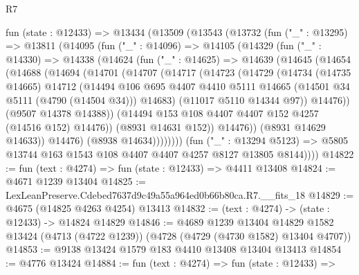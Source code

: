 \begin{lexlean}{R7}
\begin{coremodule}
  fun (state : @12433) =>
  @13434
    (@13509
      (@13543
        (@13732
          (fun ("_" : @13295) =>
          @13811
            (@14095
              (fun ("_" : @14096) =>
              @14105
                (@14329
                  (fun ("_" : @14330) =>
                  @14338
                    (@14624
                      (fun ("_" : @14625) =>
                      @14639
                        (@14645
                          (@14654
                            (@14688
                              (@14694
                                (@14701
                                  (@14707
                                    (@14717
                                      (@14723
                                        (@14729
                                          (@14734
                                            (@14735 @14665)
                                            @14712
                                            (@14494
                                              @106
                                              @695
                                              @4407
                                              @4410
                                              @5111
                                              @14665
                                              (@14501 @34 @5111 (@4790 (@14504 @34)))
                                              @14683)
                                            (@11017 @5110 @14344 @97))
                                          @14476))
                                      (@9507 @14378 @14388))
                                    (@14494 @153 @108 @4407 @4407 @152 @4257 (@14516 @152) @14476))
                                  (@8931 @14631 @152))
                                @14476))
                            (@8931 @14629 @14633))
                          @14476)
                        (@8938 @14634))))))))
          (fun ("_" : @13294 @5123) =>
          @5805 @13744 @163 @1543 @108 @4407 @4407 @4257 @8127 @13805 @8144))))
@14822 := fun (text : @4274) => fun (state : @12433) => @4411 @13408
@14824 := @4671 @1239 @13404
@14825 := LexLeanPreserve.Cdebed7637d9c49a55a964ed0b66b80ca.R7.__fits_18
@14829 := @4675 (@14825 @4263 @4254) @13413
@14832 := (text : @4274) -> (state : @12433) -> @14824 @14829
@14846 := @4689
    @1239
    @13404
    @14829
    @1582
    @13424
    (@4713 (@4722 @1239))
    (@4728 (@4729 (@4730 @1582) @13404 @4707))
@14853 := @9138 @13424 @1579 @183 @4410 @13408 @13404 @13413
@14854 := @4776 @13424
@14884 := fun (text : @4274) =>
  fun (state : @12433) =>

\end{coremodule}
\end{lexlean}
